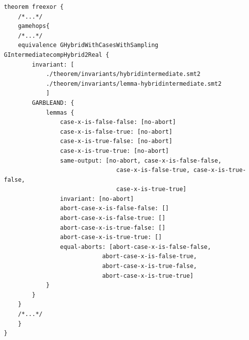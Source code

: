 \begin{longlisting}
\begin{verbatim}
theorem freexor {
    /*...*/
    gamehops{
    /*...*/
    equivalence GHybridWithCasesWithSampling GIntermediatecompHybrid2Real {
        invariant: [
            ./theorem/invariants/hybridintermediate.smt2
            ./theorem/invariants/lemma-hybridintermediate.smt2
            ]
        GARBLEAND: {
            lemmas {
                case-x-is-false-false: [no-abort]
                case-x-is-false-true: [no-abort]
                case-x-is-true-false: [no-abort]
                case-x-is-true-true: [no-abort]
                same-output: [no-abort, case-x-is-false-false,
                                case-x-is-false-true, case-x-is-true-false, 
                                case-x-is-true-true]
                invariant: [no-abort]
                abort-case-x-is-false-false: []
                abort-case-x-is-false-true: []
                abort-case-x-is-true-false: []
                abort-case-x-is-true-true: []
                equal-aborts: [abort-case-x-is-false-false, 
                            abort-case-x-is-false-true,
                            abort-case-x-is-true-false, 
                            abort-case-x-is-true-true]
            }
        }
    } 
    /*...*/
    }
}
\end{verbatim}
\caption{Game hop 5 in the  theorem}
\label{lst:domino-freexor-gamehop4}
\end{longlisting}